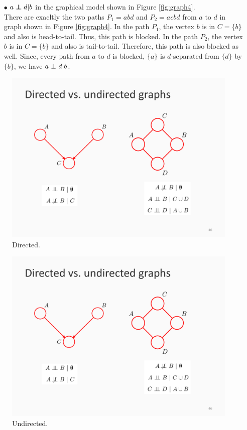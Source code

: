 \documentclass[12pt, fullpage,letterpaper]{article}
\newcommand\independent{\protect\mathpalette{\protect\independenT}{\perp}}
\def\independenT#1#2{\mathrel{\rlap{$#1#2$}\mkern2mu{#1#2}}}
\begin{document}
\begin{enumerate}
{\begin{itemize}
\item[$\bullet$] $a \independent d | b$ in the graphical model shown in Figure  \ref{fig:graph4}.\\
There are exacltly the two paths $P_1 = abd$ and $P_2= acbd$ from $a$ to $d$ in graph shown in Figure  \ref{fig:graph4}.
In the path $P_1$, the vertex $b$ is in $C=\{b\}$ and also is head-to-tail. Thus, this path is blocked.
In the path $P_2$, the vertex $b$ is in $C=\{b\}$ and also is tail-to-tail. Therefore, this path is also blocked as well.
Since, every path from $a$ to $d$ is blocked, $\{a\}$ is $d$-separated from $\{d\}$ by $\{b\}$, we have $a \independent d | b$.


\end{itemize}


}

\begin{figure}[h]
	\centering
	\includegraphics[width=0.2\linewidth]{./fig4.pdf} 
	\caption{Directed.} \label{fig:graph5}
\end{figure}
\begin{figure}[h]
	\centering
	\includegraphics[width=0.2\linewidth]{./fig5.pdf} 
	\caption{Undirected.} \label{fig:graph6}
\end{figure}


\end{enumerate}
\end{document}
